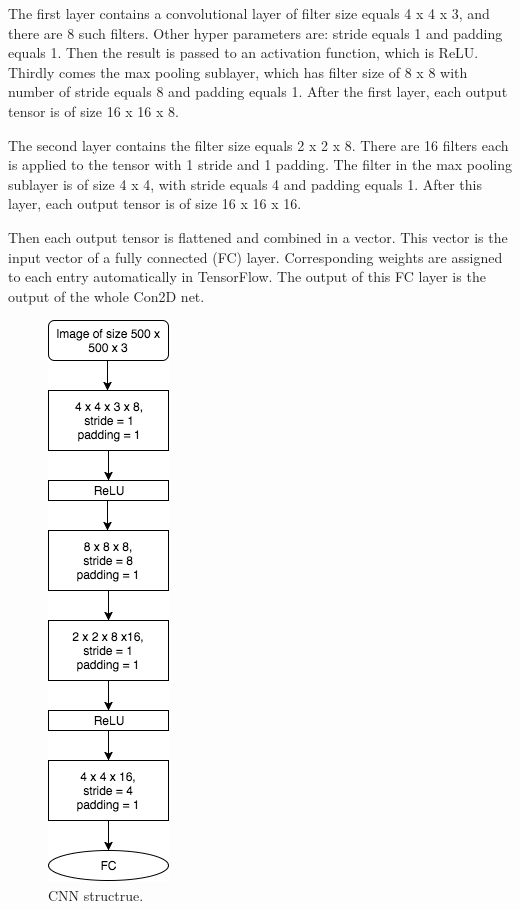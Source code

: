 \documentclass{article}
\begin{document}
The first layer contains a convolutional layer of filter size equals 4 x 4 x 3, and there are 8 such filters. Other hyper parameters are: stride equals 1 and padding equals 1. Then the result is passed to an activation function, which is ReLU. Thirdly comes the max pooling sublayer, which has filter size of 8 x 8 with number of stride equals 8 and padding equals 1. After the first layer, each output tensor is of size 16 x 16 x 8.

The second layer contains the filter size equals 2 x 2 x 8. There are 16 filters each is applied to the tensor with 1 stride and 1 padding. The filter in the max pooling sublayer is of size 4 x 4, with stride equals 4 and padding equals 1. After this layer, each output tensor is of size 16 x 16 x 16.

Then each output tensor is flattened and combined in a vector. This vector is the input vector of a fully connected (FC) layer. Corresponding weights are assigned to each entry automatically in TensorFlow. The output of this FC layer is the output of the whole Con2D net.



\begin{figure}[ht]
  \centering
  \includegraphics[width=0.2\linewidth]{cnn_structrue_1.png}
  \caption{CNN structrue.}
  \label{cnn_structrue_1}
\end{figure}
\end{document}
